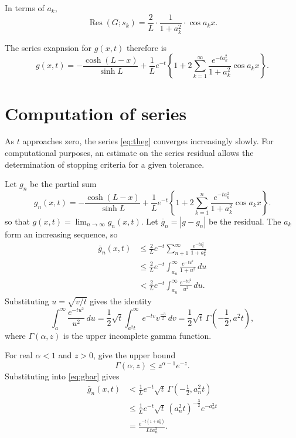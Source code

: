 \documentclass[parskip=half]{scrartcl}
\DeclareMathOperator{\Res}{Res}
\begin{document}
In terms of $a_k$,
\begin{equation}
    \Res(G; s_k) = \frac{2}{L}\cdot\frac{1}{1+a_k^2}\cdot\cos a_kx.
\end{equation}

The series exapnsion for $g(x, t)$ therefore is
\begin{equation}
    g(x, t) = -\frac{\cosh(L-x)}{\sinh L} + \frac{1}{L}e^{-t}\left\{
	1+2\sum_{k=1}^\infty \frac{e^{-ta_k^2}}{1+a_k^2}\cos a_k x\right\}.
    \label{eq:theg}
\end{equation}

\section{Computation of series}

As $t$ approaches zero, the series \eqref{eq:theg} converges increasingly slowly.
For computational purposes, an estimate on the series residual allows the determination
of stopping criteria for a given tolerance.

Let $g_n$ be the partial sum
\begin{equation}
    g_n(x, t) = -\frac{\cosh(L-x)}{\sinh L} + \frac{1}{L}e^{-t}\left\{
	1+2\sum_{k=1}^n \frac{e^{-ta_k^2}}{1+a_k^2}\cos a_k x\right\}.
\end{equation}
so that $g(x, t) =\lim_{n\to\infty} g_n(x,t)$. Let $\bar{g}_n = |g-g_n|$ be the
residual. The $a_k$ form an increasing sequence, so
\begin{equation}
    \begin{aligned}
	\bar{g}_n(x,t)
	    & \leq \frac{2}{L}e^{-t}\sum_{n+1}^\infty\frac{e^{-ta_k^2}}{1+a_k^2}\\
	    & \leq \frac{2}{L}e^{-t}\int_{a_n}^\infty \frac{e^{-tu^2}}{1+u^2}\,du\\
	    & < \frac{2}{L}e^{-t}\int_{a_n}^\infty \frac{e^{-tu^2}}{u^2}\,du.
    \end{aligned}
    \label{eq:gbar}
\end{equation}
Substituting $u=\sqrt{v/t}$ gives the identity
\begin{equation}
    \int_{a}^\infty \frac{e^{-tu^2}}{u^2}\,du
    = \frac{1}{2}\sqrt{t}\int_{a^2t}^\infty e^{-tv} v^{\frac{-3}{2}}\,dv
    = \frac{1}{2}\sqrt{t}\,\Gamma(-\frac{1}{2},a^2 t),
\end{equation}
where $\Gamma(\alpha, z)$ is the upper incomplete gamma function.

For real $\alpha<1$ and $z>0$, \textcite[][Theorem 2.3]{borwein2009} give the upper bound
\[
    \Gamma(\alpha, z) \leq z^{\alpha-1} e^{-z}.
\]
Substituting into \eqref{eq:gbar} gives
\begin{equation}
    \begin{aligned}
	\bar{g}_n(x,t)
	    & < \frac{1}{L}e^{-t}\sqrt{t}\,\Gamma(-\frac{1}{2},a_n^2 t) \\
	    & \leq \frac{1}{L}e^{-t}\sqrt{t}\,(a_n^2 t)^{-\frac{3}{2}}e^{-a_n^2t} \\
            & = \frac{e^{-t(1+a_n^2)}}{L t a_n^3}.
    \end{aligned}
\end{equation}

\printbibliography
\end{document}

